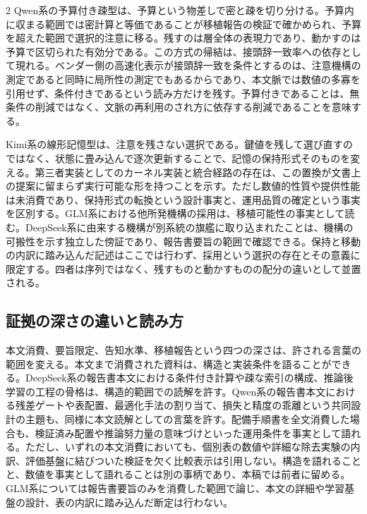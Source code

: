 \documentclass[lualatex,a4paper,10pt]{jlreq}
\begin{document}
\begin{multicols}{2}
Qwen系の予算付き疎型は、予算という物差しで密と疎を切り分ける。予算内に収まる範囲では密計算と等価であることが移植報告の検証で確かめられ、予算を超えた範囲で選択的注意に移る\autocite{qwen38next}\autocite{qwenpr}\autocite{nvblogqwen}。残すのは層全体の表現力であり、動かすのは予算で区切られた有効分である。この方式の帰結は、接頭辞一致率への依存として現れる。ベンダー側の高速化表示が接頭辞一致を条件とするのは、注意機構の測定であると同時に局所性の測定でもあるからであり、本文脈では数値の多寡を引用せず、条件付きであるという読み方だけを残す\autocite{nvblogqwen}\autocite{qwenblog}。予算付きであることは、無条件の削減ではなく、文脈の再利用のされ方に依存する削減であることを意味する。

Kimi系の線形記憶型は、注意を残さない選択である。鍵値を残して選び直すのではなく、状態に畳み込んで逐次更新することで、記憶の保持形式そのものを変える。第三者実装としてのカーネル実装と統合経路の存在は、この置換が文書上の提案に留まらず実行可能な形を持つことを示す\autocite{kimigithub}\autocite{kda}。ただし数値的性質や提供性能は未消費であり、保持形式の転換という設計事実と、運用品質の確定という事実を区別する。GLM系における他所発機構の採用は、移植可能性の事実として読む。DeepSeek系に由来する機構が別系統の旗艦に取り込まれたことは、機構の可搬性を示す独立した傍証であり、報告書要旨の範囲で確認できる\autocite{glm5report}\autocite{glm5github}。保持と移動の内訳に踏み込んだ記述はここでは行わず、採用という選択の存在とその意義に限定する。四者は序列ではなく、残すものと動かすものの配分の違いとして並置される。

\subsection{証拠の深さの違いと読み方}
本文消費、要旨限定、告知水準、移植報告という四つの深さは、許される言葉の範囲を変える。本文まで消費された資料は、構造と実装条件を語ることができる。DeepSeek系の報告書本文における条件付き計算や疎な索引の構成、推論後学習の工程の骨格は、構造的範囲での読解を許す\autocite{v41report}。Qwen系の報告書本文における残差ゲートや表配置、最適化手法の割り当て、損失と精度の乖離という共同設計の主題も、同様に本文読解としての言葉を許す\autocite{qwen38next}。配備手順書を全文消費した場合も、検証済み配置や推論努力量の意味づけといった運用条件を事実として語れる\autocite{vllmrecipe}\autocite{dynamo}\autocite{vllmv41}。ただし、いずれの本文消費においても、個別表の数値や詳細な除去実験の内訳、評価基盤に結びついた検証を欠く比較表示は引用しない。構造を語れることと、数値を事実として語れることは別の事柄であり、本稿では前者に留める。GLM系については報告書要旨のみを消費した範囲で論じ、本文の詳細や学習基盤の設計、表の内訳に踏み込んだ断定は行わない\autocite{glm5report}。


\end{multicols}
\end{document}
